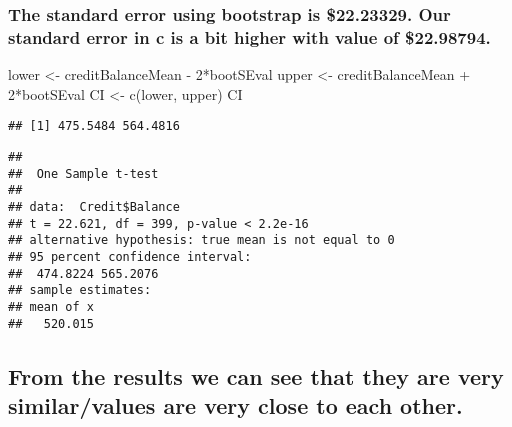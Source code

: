 \documentclass[
]{article}
\newenvironment{Shaded}{\begin{snugshade}}{\end{snugshade}}
\newcommand{\AttributeTok}[1]{\textcolor[rgb]{0.77,0.63,0.00}{#1}}
\newcommand{\DecValTok}[1]{\textcolor[rgb]{0.00,0.00,0.81}{#1}}
\newcommand{\FloatTok}[1]{\textcolor[rgb]{0.00,0.00,0.81}{#1}}
\newcommand{\FunctionTok}[1]{\textcolor[rgb]{0.00,0.00,0.00}{#1}}
\newcommand{\NormalTok}[1]{#1}
\newcommand{\OtherTok}[1]{\textcolor[rgb]{0.56,0.35,0.01}{#1}}
\newcommand{\SpecialCharTok}[1]{\textcolor[rgb]{0.00,0.00,0.00}{#1}}
\begin{document}
\hypertarget{the-standard-error-using-bootstrap-is-22.23329.-our-standard-error-in-c-is-a-bit-higher-with-value-of-22.98794.}{%
\subsubsection{The standard error using bootstrap is \$22.23329. Our
standard error in c is a bit higher with value of
\$22.98794.}\label{the-standard-error-using-bootstrap-is-22.23329.-our-standard-error-in-c-is-a-bit-higher-with-value-of-22.98794.}}

\begin{Shaded}
\begin{Highlighting}[]
\NormalTok{lower }\OtherTok{\textless{}{-}}\NormalTok{ creditBalanceMean }\SpecialCharTok{{-}} \DecValTok{2}\SpecialCharTok{*}\NormalTok{bootSEval}
\NormalTok{upper }\OtherTok{\textless{}{-}}\NormalTok{ creditBalanceMean }\SpecialCharTok{+} \DecValTok{2}\SpecialCharTok{*}\NormalTok{bootSEval}
\NormalTok{CI }\OtherTok{\textless{}{-}} \FunctionTok{c}\NormalTok{(lower, upper) }
\NormalTok{CI}
\end{Highlighting}
\end{Shaded}

\begin{verbatim}
## [1] 475.5484 564.4816
\end{verbatim}

\begin{Shaded}
\end{Shaded}

\begin{verbatim}
## 
##  One Sample t-test
## 
## data:  Credit$Balance
## t = 22.621, df = 399, p-value < 2.2e-16
## alternative hypothesis: true mean is not equal to 0
## 95 percent confidence interval:
##  474.8224 565.2076
## sample estimates:
## mean of x 
##   520.015
\end{verbatim}

\hypertarget{from-the-results-we-can-see-that-they-are-very-similarvalues-are-very-close-to-each-other.}{%
\subsection{From the results we can see that they are very
similar/values are very close to each
other.}\label{from-the-results-we-can-see-that-they-are-very-similarvalues-are-very-close-to-each-other.}}
\end{document}
